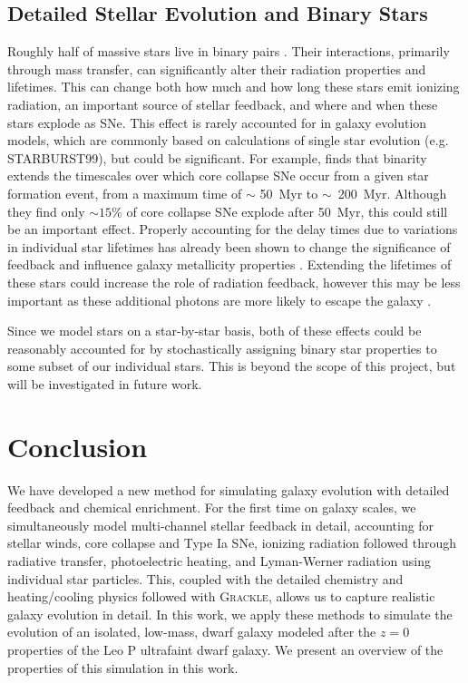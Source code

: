\documentclass[twocolumn]{aastex61}
\begin{document}
\subsection{Detailed Stellar Evolution and Binary Stars}
\label{sec:binary stars} 

Roughly half of massive stars live in binary pairs \citep{Sana2013}. Their interactions, primarily through mass transfer, can significantly alter their radiation properties and lifetimes. This can change both how much and how long these stars emit ionizing radiation, an important source of stellar feedback, and where and when these stars explode as SNe. This effect is rarely accounted for in galaxy evolution models, which are commonly based on calculations of single star evolution (e.g. STARBURST99), but could be significant. For example, \citet{Zapartas2017} finds that binarity extends the timescales over which core collapse SNe occur from a given star formation event, from a maximum time of $\sim$ 50~Myr to $\sim$~200~Myr. Although they find only $\sim 15\%$ of core collapse SNe explode after 50~Myr, this could still be an important effect. Properly accounting for the delay times due to variations in individual star lifetimes has already been shown to change the significance of feedback and influence galaxy metallicity properties \citep{Kimm2015}. Extending the lifetimes of these stars could increase the role of radiation feedback, however this may be less important as these additional photons are more likely to escape the galaxy \citep[e.g.][]{Ma2016-binary}. 

Since we model stars on a star-by-star basis, both of these effects could be reasonably accounted for by stochastically assigning binary star properties to some subset of our individual stars. This is beyond the scope of this project, but will be investigated in future work.

\section{Conclusion}
\label{sec:conclusion}
We have developed a new method for simulating galaxy evolution with detailed feedback and chemical enrichment. For the first time on galaxy scales, we simultaneously model multi-channel stellar feedback in detail, accounting for stellar winds, core collapse and Type Ia SNe, ionizing radiation followed through radiative transfer, photoelectric heating, and Lyman-Werner radiation using individual star particles. This, coupled with the detailed chemistry and heating/cooling physics followed with \textsc{Grackle}, allows us to capture realistic galaxy evolution in detail. In this work, we apply these methods to simulate the evolution of an isolated, low-mass, dwarf galaxy modeled after the $z=0$ properties of the Leo P ultrafaint dwarf galaxy. We present an overview of the properties of this simulation 
in this work.
\end{document}
